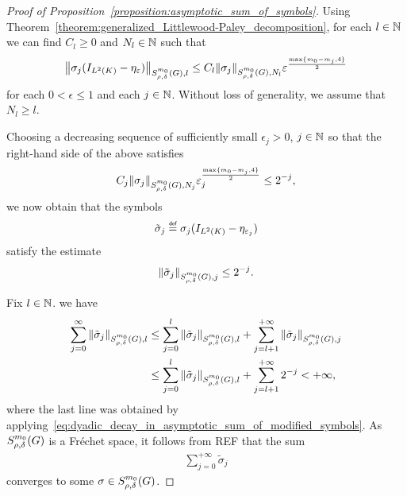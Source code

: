 \begin{proof}[Proof of Proposition~\ref{proposition:asymptotic_sum_of_symbols}]
    Using Theorem~\ref{theorem:generalized_Littlewood-Paley_decomposition},
    for each $l \in \N$ we can find $C_l \geq 0$ and $N_l \in \N$ such that
    \begin{align*}
        \SymbolSemiNorm {m_0} {\rho, \delta} l {\sigma_j (\Id {\Lebesgue 2 \CompactGroup} - \eta_\epsilon)}
        \leq C_l \SymbolSemiNorm {m_0} {\rho, \delta} {N_l} {\sigma_j}
        \epsilon^{\frac {\max\{m_0 - m_j, 4\}} 2}
    \end{align*}
    for each $0 < \epsilon \leq 1$ and each $j \in \N$.
    Without loss of generality,
    we assume that $N_l \geq l$.

    Choosing a decreasing sequence of sufficiently small $\epsilon_j > 0$, $j \in \N$
    so that the right-hand side of the above satisfies
    \begin{align*}
        C_j \SymbolSemiNorm {m_0} {\rho, \delta} {N_j} {\sigma_j} \epsilon_j^{\frac {\max \{m_0 - m_j, 4\}} 2}
        \leq 2^{-j},
    \end{align*}
    we now obtain that the symbols
    \begin{align*}
        \tilde \sigma_j \defeq \sigma_j (\Id {\Lebesgue 2 \CompactGroup} - \eta_{\epsilon_j})
    \end{align*}
    satisfy the estimate
    \begin{align}
        \SymbolSemiNorm {m_0} {\rho, \delta} j {\tilde \sigma_j}
        \leq 2^{-j}.
        \label{eq:dyadic_decay_in_asymptotic_sum_of_modified_symbols}
    \end{align}

    Fix $l \in \N$.
    we have
    \begin{align}
        \sum_{j = 0}^\infty \SymbolSemiNorm {m_0} {\rho, \delta} l {\tilde \sigma_j}
        &\leq \sum_{j = 0}^l \SymbolSemiNorm {m_0} {\rho, \delta} l {\tilde \sigma_j}
        + \sum_{j = l + 1}^{+\infty} \SymbolSemiNorm {m_0} {\rho, \delta} {j} {\tilde \sigma_j} \notag\\
        &\leq \sum_{j = 0}^l \SymbolSemiNorm {m_0} {\rho, \delta} l {\tilde \sigma_j}
        + \sum_{j = l + 1}^{+\infty} 2^{-j} < + \infty,
        \label{eq:convergence_of_asymptotic_sum_of_modified_symbols}
    \end{align}
    where the last line was obtained by applying~\eqref{eq:dyadic_decay_in_asymptotic_sum_of_modified_symbols}.
    As $\SymbolClass {m_0} {\rho, \delta}$ is a Fr\'echet space,
    it follows from REF that the sum
    \begin{align*}
        \sum_{j = 0}^{+\infty} \tilde \sigma_j
    \end{align*}
    converges to some $\sigma \in \SymbolClass {m_0} {\rho, \delta}$.


\end{proof}
